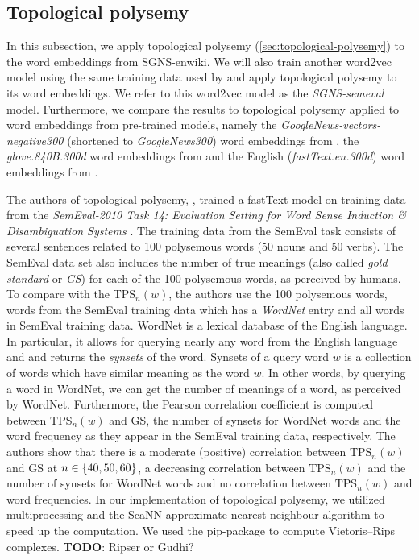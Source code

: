 \subsection{Topological polysemy}
In this subsection, we apply topological polysemy (\cref{sec:topological-polysemy}) to the word embeddings from SGNS-enwiki. We will also train another word2vec model using the same training data used by \cite{jakubowski2020topology} and apply topological polysemy to its word embeddings. We refer to this word2vec model as the \textit{SGNS-semeval} model. Furthermore, we compare the results to topological polysemy applied to word embeddings from pre-trained models, namely the \textit{GoogleNews-vectors-negative300} (shortened to \textit{GoogleNews300}) word embeddings from \cite{GoogleCodeArchiveWord2vec}, the \textit{glove.840B.300d} word embeddings from \cite{GloVeProject2014} and the English (\textit{fastText.en.300d}) word embeddings from \cite{grave2018learning}.

The authors of topological polysemy, \cite{jakubowski2020topology}, trained a fastText model on training data from the \textit{SemEval-2010 Task 14: Evaluation Setting for Word Sense Induction \& Disambiguation Systems} \cite{manandhar-klapaftis-2009-semeval}. The training data from the SemEval task consists of several sentences related to 100 polysemous words (50 nouns and 50 verbs). The SemEval data set also includes the number of true meanings (also called \textit{gold standard} or \textit{GS}) for each of the 100 polysemous words, as perceived by humans. To compare with the $\text{TPS}_n(w)$, the authors use the 100 polysemous words, words from the SemEval training data which has a \textit{WordNet} \cite{fellbaum1998} entry and all words in SemEval training data. WordNet is a lexical database of the English language. In particular, it allows for querying nearly any word from the English language and and returns the \textit{synsets} of the word. Synsets of a query word $w$ is a collection of words which have similar meaning as the word $w$. In other words, by querying a word in WordNet, we can get the number of meanings of a word, as perceived by WordNet. Furthermore, the Pearson correlation coefficient \cite{James2013} is computed between $\text{TPS}_n(w)$ and GS, the number of synsets for WordNet words and the word frequency as they appear in the SemEval training data, respectively. The authors show that there is a moderate (positive) correlation between $\text{TPS}_n(w)$ and GS at $n \in \left\{40, 50, 60\right\}$, a decreasing correlation between $\text{TPS}_n(w)$ and the number of synsets for WordNet words and no correlation between $\text{TPS}_n(w)$ and word frequencies. In our implementation of topological polysemy, we utilized multiprocessing and the ScaNN \cite{scann2020} approximate nearest neighbour algorithm to speed up the computation. We used the  \cite{ctralie2018ripser} pip-package to compute Vietoris–Rips complexes. \textbf{TODO}: Ripser or Gudhi?

